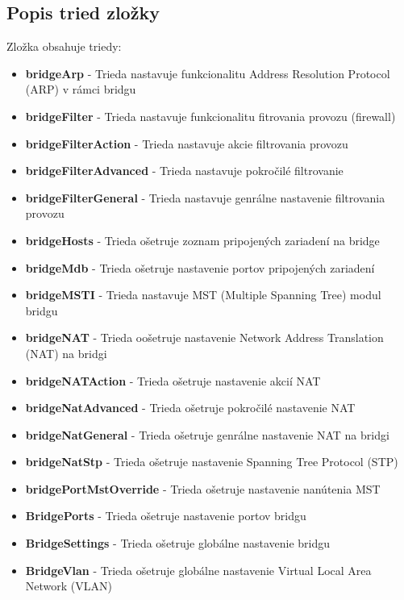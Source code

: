 \subsection{Popis tried zložky}
\label{sec:bridgechap}
Zložka obsahuje triedy:
\begin{itemize}
\item \textbf{bridgeArp} - Trieda nastavuje funkcionalitu Address Resolution Protocol (ARP) v rámci bridgu
\item \textbf{bridgeFilter} - Trieda nastavuje funkcionalitu fitrovania provozu (firewall)
\item \textbf{bridgeFilterAction} - Trieda nastavuje akcie filtrovania provozu
\item \textbf{bridgeFilterAdvanced} - Trieda nastavuje pokročilé filtrovanie
\item \textbf{bridgeFilterGeneral} - Trieda nastavuje genrálne nastavenie filtrovania provozu
\item \textbf{bridgeHosts} - Trieda ošetruje zoznam pripojených zariadení na bridge
\item \textbf{bridgeMdb} - Trieda ošetruje nastavenie portov pripojených zariadení
\item \textbf{bridgeMSTI} - Trieda nastavuje MST (Multiple Spanning Tree)  modul bridgu
\item \textbf{bridgeNAT} - Trieda oošetruje nastavenie Network Address Translation (NAT) na bridgi
\item \textbf{bridgeNATAction} - Trieda ošetruje nastavenie akcií NAT 
\item \textbf{bridgeNatAdvanced} - Trieda ošetruje pokročilé nastavenie NAT
\item \textbf{bridgeNatGeneral} - Trieda ošetruje genrálne nastavenie NAT na bridgi
\item \textbf{bridgeNatStp} - Trieda ošetruje nastavenie Spanning Tree Protocol (STP)
\item \textbf{bridgePortMstOverride} - Trieda ošetruje nastavenie nanútenia MST
\item \textbf{BridgePorts} - Trieda ošetruje nastavenie portov bridgu
\item \textbf{BridgeSettings} - Trieda ošetruje globálne nastavenie  bridgu  
\item \textbf{BridgeVlan} - Trieda ošetruje globálne nastavenie Virtual Local Area Network (VLAN)

\end{itemize}

